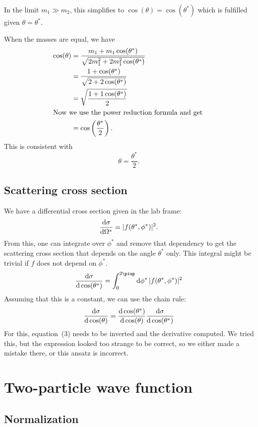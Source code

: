 \documentclass[11pt, english, fleqn, DIV=15, headinclude, BCOR=1.5cm]{scrartcl}
\begin{document}
In the limit $m_1 \gg m_2$, this simplifies to $\cos(\theta) = \cos(\theta^*)$
which is fulfilled given $\theta = \theta^*$.

When the masses are equal, we have
\begin{align*}
    \cos(\theta)
    &= \frac{m_1 + m_1 \cos(\theta^*)}{\sqrt{2 m_1^2 + 2m_1^2 \cos(\theta^*)}} \\
    &= \frac{1 + \cos(\theta^*)}{\sqrt{2 + 2\cos(\theta^*)}} \\
    &= \sqrt{\frac{1 + 1\cos(\theta^*)}2} \\
    \intertext{%
        Now we use the power reduction formula and get
    }
    &= \cos\del{\frac{\theta^*}{2}}.
\end{align*}
This is consistent with
\[
    \theta = \frac{\theta^*}2.
\]

\subsection{Scattering cross section}

We have a differential cross section given in the lab frame:
\[
    \frac{\mathop{}\!\mathrm d {\sigma}}{\mathop{}\!\mathrm d {\Omega^*}} = |f(\theta^*, \phi^*)|^2.
\]
From this, one can integrate over $\phi^*$ and remove that dependency to get
the scattering cross section that depends on the angle $\theta^*$ only. This
integral might be trivial if $f$ does not depend on $\phi^*$.
\[
    \od{\sigma}{\,\cos(\theta^*)} = \int_0^{2\piup} \dif \phi^* \, |f(\theta^*, \phi^*)|^2
\]
Assuming that this is a constant, we can use the chain rule:
\[
    \frac{\mathop{}\!\mathrm d {\sigma}}{\mathop{}\!\mathrm d {\, \cos(\theta)}}
    = \frac{\mathop{}\!\mathrm d {\, \cos(\theta^*)}}{\mathop{}\!\mathrm d {\, \cos(\theta)}} \frac{\mathop{}\!\mathrm d {\sigma}}{\mathop{}\!\mathrm d {\, \cos(\theta^*)}}
\]
For this, equation~(3) needs to be inverted and the derivative computed. We
tried this, but the expression looked too strange to be correct, so we either
made a mistake there, or this ansatz is incorrect.


\section{Two-particle wave function}

\subsection{Normalization}
\end{document}
